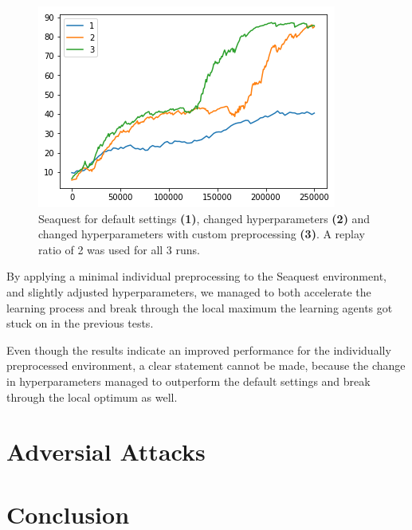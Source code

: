 \begin{figure}[h]
\includegraphics[scale=0.8]{bilder/seaquestprepro}
\caption{Seaquest for default settings \textbf{(1)}, changed hyperparameters \textbf{(2)} and changed hyperparameters with custom preprocessing \textbf{(3)}. A replay ratio of 2 was used for all 3 runs.}
\end{figure}

By applying a minimal individual preprocessing to the Seaquest environment, and slightly adjusted hyperparameters, we managed to both accelerate the learning process and break through the local maximum the learning agents got stuck on in the previous tests.

Even though the results indicate an improved performance for the individually preprocessed environment, a clear statement cannot be made, because the change in hyperparameters managed to outperform the default settings and break through the local optimum as well.

\section{Adversial Attacks}

\section{Conclusion}